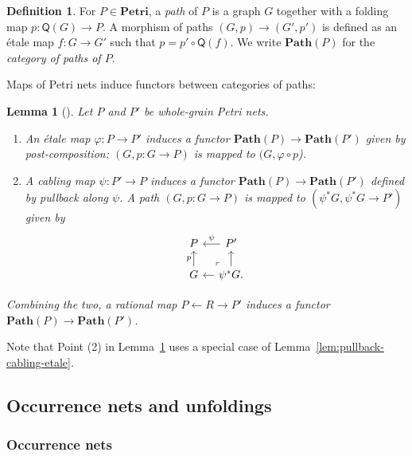 \documentclass[11pt,a4paper]{article}
\theoremstyle{plain}
\newtheorem{lemma}[theorem]{Lemma}
\theoremstyle{definition}
\newtheorem{definition}[theorem]{Definition}
\theoremstyle{remark}
\newcommand{\Petri}{\mathbf{Petri}}
\newcommand{\Q}{\mathsf{Q}}
\newcommand{\Path}{\mathbf{Path}}
\begin{document}
\begin{definition}
  For $P \in \Petri$, a \emph{path} of $P$ is a graph $G$   together with a folding map $p : \Q(G) \to P$. A morphism of paths $(G, p) \to (G', p')$
  is defined as an \'etale map $f : G \to G'$ such that $p = p' \circ \Q(f)$. We
  write $\Path(P)$ for the \emph{category of paths of $P$}.
\end{definition}


Maps of Petri nets induce functors between categories of paths:
\begin{lemma}[\cite{WGPN}]
	\label{lem:functoriality}
	Let $P$ and $P'$ be whole-grain Petri nets.
	\begin{enumerate}
\item An \'etale map $\varphi : P \to P'$ induces a functor $\Path(P) \to \Path(P')$ given by post-composition: $(G, p : G \to P)$ is mapped to $(G, \varphi \circ p$).
\item A cabling map $\psi : P' \to P$ induces a functor $\Path(P) \to \Path(P')$ defined by pullback along $\psi$. A path $(G, p : G \to P)$ is mapped to $(\psi^*G, \psi^*G \to P')$ given by 
\[\begin{tikzcd}[row sep=1.4em, column sep=1em]
	P & {P'} \\
	G & {\psi^*G}.
	\arrow["\psi"',from=1-2, to=1-1]
	\arrow["p",from=2-1, to=1-1]
	\arrow["\lrcorner"{anchor=center, pos=0.125, rotate=180}, draw=none, from=2-2, to=1-1]
	\arrow[from=2-2, to=1-2]
	\arrow[from=2-2, to=2-1]
\end{tikzcd}\]
	\end{enumerate}
Combining the two, a rational map $P \leftarrow R \rightarrow P'$ induces a functor $\Path(P) \to \Path(P')$.
\end{lemma}

Note that Point (2) in Lemma~\ref{lem:functoriality} uses a special case of Lemma~\ref{lem:pullback-cabling-etale}.









\subsection{Occurrence nets and unfoldings}
\label{subsec:occ-unfold}

\subsubsection{Occurrence nets}
\end{document}
